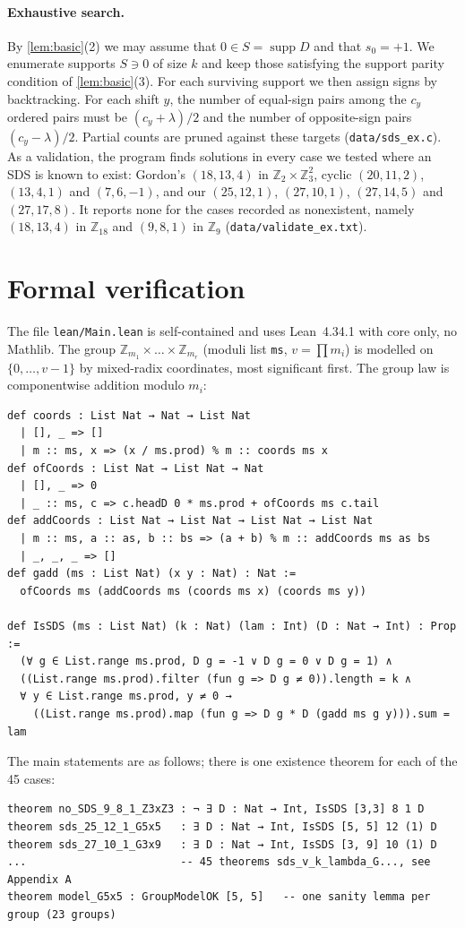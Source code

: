 \documentclass[11pt]{article}
\numberwithin{equation}{section}
\theoremstyle{definition}
\theoremstyle{remark}
\newcommand{\Z}{\mathbb Z}
\DeclareMathOperator{\supp}{supp}
\begin{document}
\paragraph{Exhaustive search.} By \cref{lem:basic}(2) we may assume that $0\in S=\supp D$ and that
$s_0=+1$. We enumerate supports $S\ni 0$ of size $k$ and keep those satisfying the support parity
condition of \cref{lem:basic}(3). For each surviving support we then assign signs by
backtracking. For each shift $y$, the number of equal-sign pairs among the $c_y$ ordered pairs must
be $(c_y+\lambda)/2$ and the number of opposite-sign pairs $(c_y-\lambda)/2$. Partial counts are
pruned against these targets (\texttt{data/sds\_ex.c}). As a validation, the program finds
solutions in every case we tested where an SDS is known to exist: Gordon's $(18,13,4)$ in
$\Z_2\times\Z_3^2$, cyclic $(20,11,2)$, $(13,4,1)$ and $(7,6,-1)$, and our $(25,12,1)$,
$(27,10,1)$, $(27,14,5)$ and $(27,17,8)$. It reports none for the cases recorded as nonexistent,
namely $(18,13,4)$ in $\Z_{18}$ and $(9,8,1)$ in $\Z_9$ (\texttt{data/validate\_ex.txt}).

\section{Formal verification}\label{sec:lean}

The file \texttt{lean/Main.lean} is self-contained and uses Lean~4.34.1 with core only, no
Mathlib. The group $\Z_{m_1}\times\dots\times\Z_{m_r}$ (moduli list \texttt{ms}, $v=\prod m_i$)
is modelled on $\{0,\dots,v-1\}$ by mixed-radix coordinates, most significant first. The group
law is componentwise addition modulo $m_i$:
\begin{lstlisting}
def coords : List Nat → Nat → List Nat
  | [], _ => []
  | m :: ms, x => (x / ms.prod) % m :: coords ms x
def ofCoords : List Nat → List Nat → Nat
  | [], _ => 0
  | _ :: ms, c => c.headD 0 * ms.prod + ofCoords ms c.tail
def addCoords : List Nat → List Nat → List Nat → List Nat
  | m :: ms, a :: as, b :: bs => (a + b) % m :: addCoords ms as bs
  | _, _, _ => []
def gadd (ms : List Nat) (x y : Nat) : Nat :=
  ofCoords ms (addCoords ms (coords ms x) (coords ms y))

def IsSDS (ms : List Nat) (k : Nat) (lam : Int) (D : Nat → Int) : Prop :=
  (∀ g ∈ List.range ms.prod, D g = -1 ∨ D g = 0 ∨ D g = 1) ∧
  ((List.range ms.prod).filter (fun g => D g ≠ 0)).length = k ∧
  ∀ y ∈ List.range ms.prod, y ≠ 0 →
    ((List.range ms.prod).map (fun g => D g * D (gadd ms g y))).sum = lam
\end{lstlisting}
The main statements are as follows; there is one existence theorem for each of the 45 cases:
\begin{lstlisting}
theorem no_SDS_9_8_1_Z3xZ3 : ¬ ∃ D : Nat → Int, IsSDS [3,3] 8 1 D
theorem sds_25_12_1_G5x5   : ∃ D : Nat → Int, IsSDS [5, 5] 12 (1) D
theorem sds_27_10_1_G3x9   : ∃ D : Nat → Int, IsSDS [3, 9] 10 (1) D
...                        -- 45 theorems sds_v_k_lambda_G..., see Appendix A
theorem model_G5x5 : GroupModelOK [5, 5]   -- one sanity lemma per group (23 groups)
\end{lstlisting}
\end{document}
